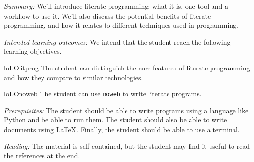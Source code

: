 
\emph{Summary:}
We'll introduce literate programming: what it is, one tool and a workflow to 
use it.
We'll also discuss the potential benefits of literate programming, and how it 
relates to different techniques used in programming.

\emph{Intended learning outcomes:}
We intend that the student reach the following learning objectives.
%
\begin{restatable}{lo}{LOlitprog}\label{LOlitprog}
  The student can distinguish the core features of literate programming and how 
  they compare to similar technologies.
\end{restatable}
%
\begin{restatable}{lo}{LOnoweb}\label{LOnoweb}
  The student can use \texttt{noweb} to write literate programs.
\end{restatable}

\emph{Prerequisites:}
The student should be able to write programs using a language like Python and 
be able to run them.
The student should also be able to write documents using \LaTeX.
Finally, the student should be able to use a terminal.

\emph{Reading:}
The material is self-contained, but the student may find it useful to read the 
references at the end.

